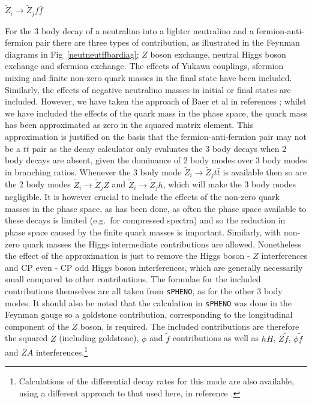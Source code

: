 \documentclass[final,3p,times]{elsarticle}
\begin{document}
\textbf{\underline{$\tilde{Z}_i \rightarrow \tilde{Z}_j f \bar{f}$}}

For the 3 body decay of a neutralino into a lighter neutralino and a fermion-anti-fermion pair there are three types of contribution, as illustrated in the Feynman diagrams in Fig~\ref{neutneutffbardiag}; $Z$ boson exchange, neutral Higgs boson exchange and sfermion exchange. The effects of Yukawa couplings, sfermion mixing and finite non-zero quark masses in the final state have been included. Similarly, the effects of negative neutralino masses in initial or final states are included. However, we have taken the approach of Baer et al in references \cite{Baer:1998,TataBaer}; whilst we have included the effects of the quark mass in the phase space, the quark mass has been approximated as zero in the squared matrix element. This approximation is justified on the basis that the fermion-anti-fermion pair may not be a $t\bar{t}$ pair as the decay calculator only evaluates the 3 body decays when 2 body decays are absent, given the dominance of 2 body modes over 3 body modes in branching ratios. Whenever the 3 body mode $\tilde{Z}_i \rightarrow \tilde{Z}_j t \bar{t}$ is available then so are the 2 body modes $\tilde{Z}_i \rightarrow \tilde{Z}_j Z$ and $\tilde{Z}_i \rightarrow \tilde{Z}_j h$, which will make the 3 body modes negligible. It is however crucial to include the effects of the non-zero quark masses in the phase space, as has been done, as often the phase space available to these decays is limited (e.g.\ for compressed spectra) and so the reduction in phase space caused by the finite quark masses is important. Similarly, with non-zero quark masses the Higgs intermediate contributions are allowed. Nonetheless the effect of the approximation is just to remove the Higgs boson - $Z$ interferences and CP even - CP odd Higgs boson interferences, which are generally necessarily small compared to other contributions. The formulae for the included contributions themselves are all taken from {\tt sPHENO}, as for the other 3 body modes. It should also be noted that the calculation in {\tt sPHENO} was done in the Feynman gauge so a goldstone contribution, corresponding to the longitudinal component of the $Z$ boson, is required. The included contributions are therefore the squared $Z$ (including goldstone), $\phi$ and $\tilde{f}$ contributions as well as $hH$, $Z\tilde{f}$, $\phi\tilde{f}$ and $ZA$ interferences.\footnote{Calculations of the differential decay rates for this mode are also available, using a different approach to that used here, in reference \cite{Mambrini:2001}.}
\end{document}

